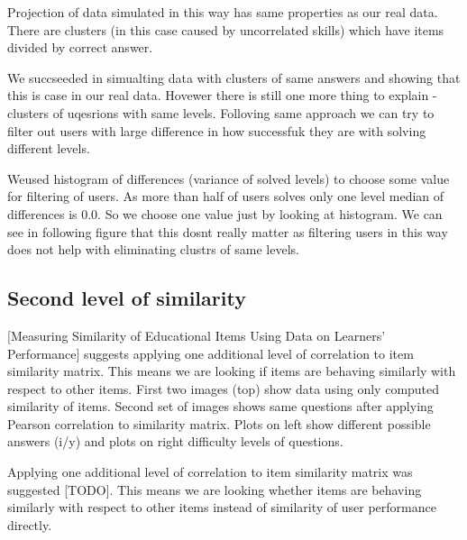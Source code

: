 \documentclass[
  digital, %
  table,   %
  nolof,     %
  nolot,     %
  nocover
]{fithesis3}
\begin{document}
Projection of data simulated in this way has same properties as our real data. There are clusters (in this case caused by uncorrelated skills) which have items divided by correct answer.


We succseeded in simualting data with clusters of same answers and
showing that this is case in our real data. Hovewer there is still one
more thing to explain - clusters of uqesrions with same levels.
Folloving same approach we can try to filter out users with large
difference in how successfuk they are with solving different levels.

Weused histogram of differences (variance of solved levels) to choose
some value for filtering of users. As more than half of users solves
only one level median of differences is 0.0. So we choose one value just
by looking at histogram. We can see in following figure that this dosnt
really matter as filtering users in this way does not help with
eliminating clustrs of same levels.



\subsection{Second level of
similarity}\label{second-level-of-similarity}

{[}Measuring Similarity of Educational Items Using Data on Learners'
Performance{]} suggests applying one additional level of correlation to
item similarity matrix. This means we are looking if items are behaving
similarly with respect to other items. First two images (top) show data
using only computed similarity of items. Second set of images shows same
questions after applying Pearson correlation to similarity matrix. Plots
on left show different possible answers (i/y) and plots on right
difficulty levels of questions.

Applying one additional level of correlation to item similarity matrix
was suggested {[}TODO{]}. This means we are looking whether items are
behaving similarly with respect to other items instead of similarity of
user performance directly.
\end{document}
